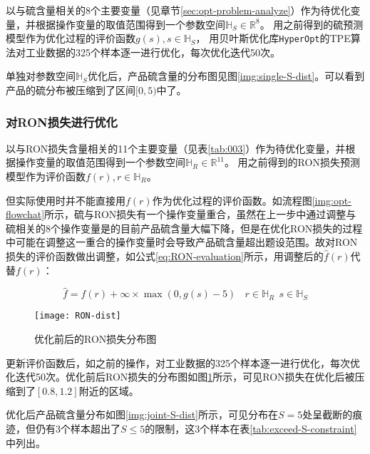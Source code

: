 \documentclass[bwprint]{gmcmthesis}
\begin{document}
以与硫含量相关的8个主要变量（见章节\ref{sec:opt-problem-analyze}）作为待优化变量，并根据操作变量的取值范围得到一个参数空间$\mathbb{H}_S \in \mathbb{R}^8$。
用之前得到的硫预测模型作为优化过程的评价函数$g(s), s\in \mathbb{H}_S$，
用贝叶斯优化库\texttt{HyperOpt}的TPE算法对工业数据的325个样本逐一进行优化，每次优化迭代50次。

单独对参数空间$\mathbb{H}_S$优化后，产品硫含量的分布图见图\ref{img:single-S-dist}。可以看到产品的硫分布被压缩到了区间$[0,5)$中了。



\FloatBarrier
\subsubsection{对RON损失进行优化}

以与RON损失含量相关的11个主要变量（见表\ref{tab:003}）作为待优化变量，并根据操作变量的取值范围得到一个参数空间$\mathbb{H}_R \in \mathbb{R}^{11}$。
用之前得到的RON损失预测模型作为评价函数$f(r), r\in \mathbb{H}_R$。



但实际使用时并不能直接用$f(r)$作为优化过程的评价函数。如流程图\ref{img:opt-flowchat}所示，硫与RON损失有一个操作变量重合，虽然在上一步中通过调整与硫相关的8个操作变量是的目前产品硫含量大幅下降，但是在优化RON损失的过程中可能在调整这一重合的操作变量时会导致产品硫含量超出题设范围。故对RON损失的评价函数做出调整，如公式\eqref{eq:RON-evaluation}所示，用调整后的$\hat{f}(r)$代替$f(r)$：

\begin{equation}\label{eq:RON-evaluation}
	\hat{f} = f(r)+{\infty \times \max({0},{g(s)-5}) } \ \ \ \ r\in \mathbb{H}_R \ \ s\in \mathbb{H}_S 
\end{equation}

\begin{figure}[htb]
	\centering
	\texttt{[image: RON-dist]}
	\caption{优化前后的RON损失分布图}
	\label{img:RON-compare}
\end{figure}

更新评价函数后，如之前的操作，对工业数据的325个样本逐一进行优化，每次优化迭代50次。优化前后RON损失的分布图如图\ref{img:RON-compare}所示，可见RON损失在优化后被压缩到了$[0.8, 1.2]$附近的区域。

优化后产品硫含量分布如图\ref{img:joint-S-dist}所示，可见分布在$S=5$处呈截断的痕迹，但仍有3个样本超出了$S\le 5$的限制，这3个样本在表\ref{tab:exceed-S-constraint}中列出。
\end{document}
